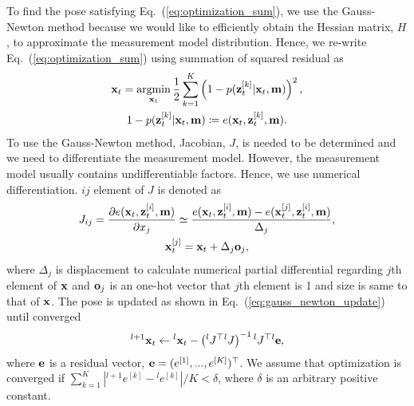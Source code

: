 \documentclass[letterpaper, 10 pt, conference]{ieeeconf}  %
\newcommand{\argmin}{\mathop{\rm argmin}\limits}
\begin{document}
To find the pose satisfying Eq.~(\ref{eq:optimization_sum}), we use the Gauss-Newton method because we would like to efficiently obtain the Hessian matrix, $H$, to approximate the measurement model distribution.
Hence, we re-write Eq.~(\ref{eq:optimization_sum}) using summation of squared residual as
%
\begin{align}
    \begin{gathered}
        {\bf x}_{t} = \argmin_{{\bf x}_{t}} \frac{1}{2} \sum_{k=1}^{K} \left( 1 - p({\bf z}_{t}^{[k]} | {\bf x}_{t}, {\bf m}) \right)^{2}, \\
        1 - p({\bf z}_{t}^{[k]} | {\bf x}_{t}, {\bf m}) \coloneqq e({\bf x}_{t}, {\bf z}_{t}^{[k]}, {\bf m}).
    \label{eq:optimization_sum_prob_error}
    \end{gathered}
\end{align}
%
To use the Gauss-Newton method, Jacobian, $J$, is needed to be determined and we need to differentiate the measurement model.
However, the measurement model usually contains undifferentiable factors.
Hence, we use numerical differentiation.
$ij$ element of $J$ is denoted as
%
\begin{align}
    \begin{gathered}
        J_{ij} = \frac{\partial e({\bf x}_{t}, {\bf z}_{t}^{[i]}, {\bf m})}{\partial x_{j}}
        \simeq \frac{e({\bf x}_{t}, {\bf z}_{t}^{[i]}, {\bf m}) - e({\bf x}_{t}^{[j]}, {\bf z}_{t}^{[i]}, {\bf m})}{\Delta_{j}}, \\
        {\bf x}_{t}^{[j]} = {\bf x}_{t} + \Delta_{j} {\bf o}_{j},
    \end{gathered}
    \label{eq:numerical_differentiation}
\end{align}
%
where $\Delta_{j}$ is displacement to calculate numerical partial differential regarding $j$th element of ${\bf x}$ and ${\bf o}_{j}$ is an one-hot vector that $j$th element is 1 and size is same to that of ${\bf x}$.
The pose is updated as shown in Eq.~(\ref{eq:gauss_newton_update}) until converged
%
\begin{align}
    {}^{l+1}{\bf x}_{t} \leftarrow {}^{l}{\bf x}_{t} - \left( {}^{l}J^{\top} {}^{l}J \right)^{-1} {}^{l}J^{\top} {}^{l}{\bf e},
    \label{eq:gauss_newton_update}
\end{align}
%
where ${\bf e}$ is a residual vector, ${\bf e} = (e^{[1]}, ..., e^{[K]})^{\top}$.
We assume that optimization is converged if $\sum_{k=1}^{K} |{}^{l+1}e^{[k]} - {}^{l}e^{[k]}| / K< \delta$, where $\delta$ is an arbitrary positive constant.
\end{document}

